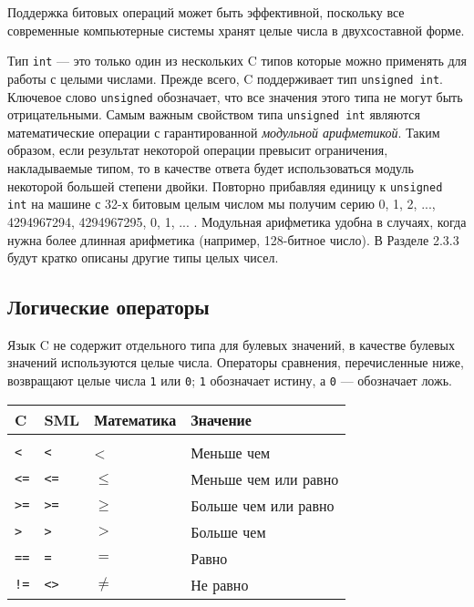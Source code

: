 Поддержка битовых операций может быть эффективной, поскольку все современные компьютерные системы хранят целые числа в двухсоставной форме.

Тип \lstinline|int| --- это только один из нескольких C типов которые можно применять для работы с целыми числами. Прежде всего, C поддерживает тип \lstinline|unsigned int|. Ключевое слово \lstinline|unsigned| обозначает, что все значения этого типа не могут быть отрицательными. Самым важным свойством типа \lstinline|unsigned int| являются математические операции с гарантированной \emph{модульной арифметикой}. Таким образом, если результат некоторой операции превысит ограничения, накладываемые типом, то в качестве ответа будет использоваться модуль некоторой большей степени двойки. Повторно прибавляя единицу к \lstinline|unsigned int| на машине с 32-х битовым целым числом мы получим серию 0, 1, 2, ..., 4294967294, 4294967295, 0, 1, ... . Модульная арифметика удобна в случаях, когда нужна более длинная арифметика (например, 128-битное число). В Разделе 2.3.3 будут кратко описаны другие типы целых чисел.

\subsection{Логические операторы}\label{logicOperators}

Язык C не содержит отдельного типа для булевых значений, в качестве булевых значений используются целые числа. Операторы сравнения, перечисленные ниже, возвращают целые числа \lstinline|1| или \lstinline|0|; \lstinline|1| обозначает истину, а \lstinline|0| --- обозначает ложь.

\begin{tabular}{llll}
  \hline \hline
  C & SML & Математика & Значение \\ \hline \\
  \lstinline|<| & \lstinline|<| & < & Меньше чем \\
  \lstinline|<=| & \lstinline|<=| & $\le$ & Меньше чем или равно \\
  \lstinline|>=| & \lstinline|>=| & $\ge$ & Больше чем или равно \\
  \lstinline|>| & \lstinline|>| & $>$ & Больше чем \\
  \lstinline|==| & \lstinline|=| & $=$ & Равно \\
  \lstinline|!=| & \lstinline|<>| & $\ne$ & Не равно \\
  \hline \hline
\end{tabular}

